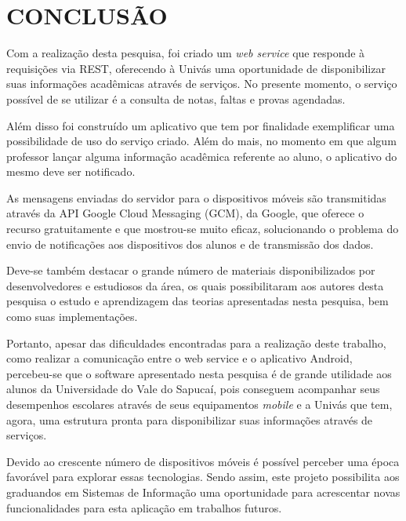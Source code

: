 
\chapter{CONCLUSÃO} 

	\par Com a realização desta pesquisa, foi criado um \textit{web service} que
responde à requisições via REST, oferecendo à Univás uma oportunidade de
disponibilizar suas informações acadêmicas através de serviços. No presente
momento, o serviço possível de se utilizar é a consulta de notas, faltas e provas
agendadas.

	\par Além disso foi construído um aplicativo que tem por finalidade
exemplificar uma possibilidade de uso do serviço criado. Além do mais, no
momento em que algum professor lançar alguma informação acadêmica referente ao
aluno, o aplicativo do mesmo deve ser notificado.

	\par As mensagens enviadas do servidor para o dispositivos móveis são
transmitidas através da API Google Cloud Messaging (GCM), da Google, que
oferece o recurso gratuitamente e que mostrou-se muito eficaz, solucionando o
problema do envio de notificações aos dispositivos dos alunos  e de transmissão
dos dados.

	\par Deve-se também destacar o grande número de materiais disponibilizados por
desenvolvedores e estudiosos da área, os quais possibilitaram aos autores desta
pesquisa o estudo e aprendizagem das teorias apresentadas nesta pesquisa, bem
como suas implementações.

	\par Portanto, apesar das dificuldades encontradas para a realização deste
trabalho, como realizar a comunicação entre o web service e o aplicativo
Android, percebeu-se que o software apresentado nesta pesquisa é de grande
utilidade aos alunos da Universidade do Vale do Sapucaí, pois conseguem
acompanhar seus desempenhos escolares através de seus equipamentos
\textit{mobile} e a Univás que tem, agora, uma estrutura pronta para
disponibilizar suas informações através de serviços.

	\par Devido ao crescente número de dispositivos móveis é possível perceber uma
época favorável para explorar essas tecnologias. Sendo assim, este projeto
possibilita aos graduandos em Sistemas de Informação uma oportunidade para
acrescentar novas funcionalidades para esta aplicação em trabalhos futuros.

